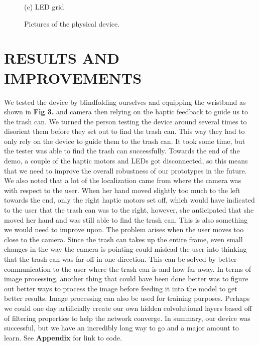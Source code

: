 \documentclass{article}
\begin{document}
\begin{center}
\begin{figure}[ht]
\begin{minipage}[b]{0.48\linewidth}
  \centerline{(c) LED grid}\medskip
\end{minipage}
%
\caption{Pictures of the physical device.}
\label{figures}
%
\end{figure}
\end{center}



\section{RESULTS AND IMPROVEMENTS}
\label{sec:results}
We tested the device by blindfolding ourselves and equipping the wristband as shown in \textbf{Fig 3.} and camera then relying on the haptic feedback to guide us to the trash can. We turned the person testing the device around several times to disorient them before they set out to find the trash can. This way they had to only rely on the device to guide them to the trash can. It took some time, but the tester was able to find the trash can successfully. Towards the end of the demo, a couple of the haptic motors and LEDs got disconnected, so this means that we need to improve the overall robustness of our prototypes in the future. We also noted that a lot of the localization came from where the camera was with respect to the user. When her hand moved slightly too much to the left towards the end, only the right haptic motors set off, which would have indicated to the user that the trash can was to the right, however, she anticipated that she moved her hand and was still able to find the trash can. This is also something we would need to improve upon. The problem arises when the user moves too close to the camera. Since the trash can takes up the entire frame, even small changes in the way the camera is pointing could mislead the user into thinking that the trash can was far off in one direction. This can be solved by better communication to the user where the trash can is and how far away. In terms of image processing, another thing that could have been done better was to figure out better ways to process the image before feeding it into the model to get better results. Image processing can also be used for training purposes. Perhaps we could one day artificially create our own hidden colvolutional layers based off of filtering properties to help the network converge. In summary, our device was successful, but we have an incredibly long way to go and a major amount to learn. See \textbf{Appendix} for link to code.
\end{document}
